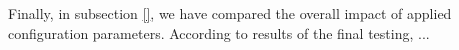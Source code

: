 



Finally, in subsection \ref{}, we have compared the overall impact of applied configuration parameters. According to results of the final testing, ...\\
